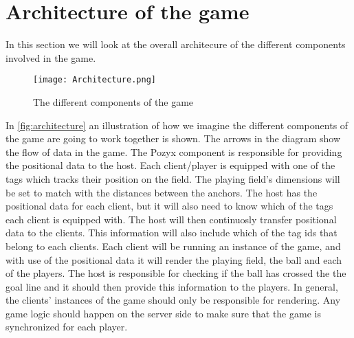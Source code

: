 \section{Architecture of the game}
In this section we will look at the overall architecure of the different components involved in the game.
\begin{figure}[H]
    \centering
    \texttt{[image: Architecture.png]}
    \caption{The different components of the game}
    \label{fig:architecture}
\end{figure}
In \autoref{fig:architecture} an illustration of how we imagine the different components of the game are going to work together is shown.
The arrows in the diagram show the flow of data in the game.
The Pozyx component is responsible for providing the positional data to the host. 
Each client/player is equipped with one of the tags which tracks their position on the field. 
The playing field's dimensions will be set to match with the distances between the anchors. 
The host has the positional data for each client, but it will also need to know which of the tags each client is equipped with.
The host will then continuosly transfer positional data to the clients.
This information will also include which of the tag ids that belong to each clients.
Each client will be running an instance of the game, and with use of the positional data it will render the playing field, the ball and each of the players.
The host is responsible for checking if the ball has crossed the the goal line and it should then provide this information to the players.
In general, the clients' instances of the game should only be responsible for rendering.
Any game logic should happen on the server side to make sure that the game is synchronized for each player. 